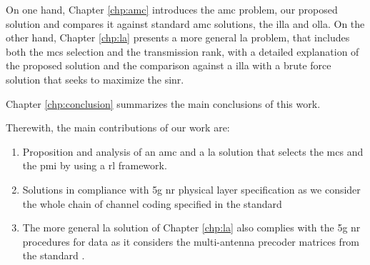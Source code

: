 On one hand, Chapter \ref{chp:amc} introduces the \gls{amc} problem, our proposed solution and compares it against standard \gls{amc} solutions, the \gls{illa} and \gls{olla}.
%
On the other hand, Chapter \ref{chp:la} presents a more general \gls{la} problem, that includes both the \gls{mcs} selection and the transmission rank, with a detailed explanation of the proposed solution and the comparison against a \gls{illa} with a brute force solution that seeks to maximize the \gls{sinr}.

Chapter \ref{chp:conclusion} summarizes the main conclusions of this work.

Therewith, the main contributions of our work are:
\begin{enumerate}
    \item Proposition and analysis of an \gls{amc} and a \gls{la} solution that selects the \gls{mcs} and the \gls{pmi} by using a \gls{rl} framework.
    \item Solutions in compliance with \gls{5g} \gls{nr} physical layer specification as we consider the whole chain of channel coding specified in the standard \cite{3gpp.38.212}
    \item The more general \gls{la} solution of Chapter \ref{chp:la} also complies with the \gls{5g} \gls{nr} procedures for data as it considers the multi-antenna precoder matrices from the standard \cite{3gpp.38.214}.
\end{enumerate}
%

